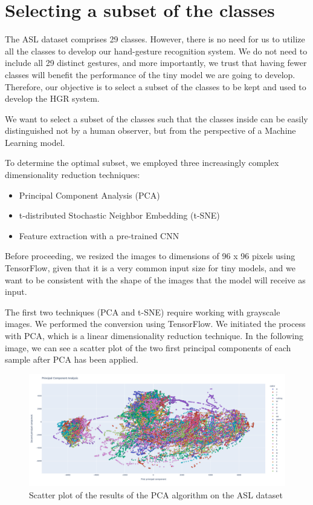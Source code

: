 \documentclass{Configuration_Files/PoliMi3i_thesis}
\begin{document}
\section{Selecting a subset of the classes}
\label{sec:subset}
The ASL dataset comprises 29 classes. However, there is no need for us to utilize all the classes to develop our hand-gesture recognition system. We do not need to include all 29 distinct gestures, and more importantly, we trust that having fewer classes will benefit the performance of the tiny model we are going to develop. Therefore, our objective is to select a subset of the classes to be kept and used to develop the HGR system.

We want to select a subset of the classes such that the classes inside can be easily distinguished not by a human observer, but from the perspective of a Machine Learning model. 

To determine the optimal subset, we employed three increasingly complex dimensionality reduction techniques:
\begin{itemize}
    \item Principal Component Analysis (PCA)
    \item t-distributed Stochastic Neighbor Embedding (t-SNE)
    \item Feature extraction with a pre-trained CNN
\end{itemize}

Before proceeding, we resized the images to dimensions of 96 x 96 pixels using TensorFlow, given that it is a very common input size for tiny models, and we want to be consistent with the shape of the images that the model will receive as input.

The first two techniques (PCA and t-SNE) require working with grayscale images. We performed the conversion using TensorFlow. We initiated the process with PCA, which is a linear dimensionality reduction technique. In the following image, we can see a scatter plot of the two first principal components of each sample after PCA has been applied. 

\begin{figure}[H]
    \centering
    \includegraphics[width=\textwidth]{Figures/eda/pca.png}
    \caption{Scatter plot of the results of the PCA algorithm on the ASL dataset}
    \label{fig:pca}
\end{figure}
\end{document}
